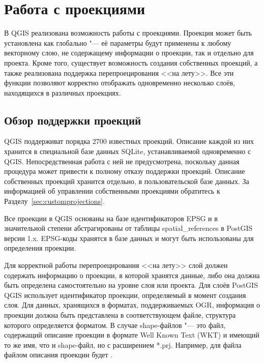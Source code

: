 
\chapter{Работа с проекциями}\label{label_projections}


В QGIS реализована возможность работы с проекциями. Проекция может быть
установлена как глобально "--- её параметры будут применены к любому
векторному слою, не содержащему информации о проекции, так и
отдельно для проекта. Кроме того, существует возможность создания
собственных проекций, а также реализована поддержка перепроецирования <<на
лету>>. Все эти функции позволяют корректно отображать одновременно несколько
слоёв, находящихся в различных проекциях.

\section{Обзор поддержки проекций}\label{label_projoverview}

QGIS поддерживат порядка 2700 известных проекций. Описание каждой из них
хранится в специальной базе данных SQLite, устанавливаемой одновременно
с QGIS. Непосредственная работа с ней не предусмотрена, поскольку данная
процедура может привести к полному отказу поддержки проекций. Описание
собственных проекций хранится отдельно, в пользовательской базе данных.
За информацией об управлении собственными проекциями обратитесь к
Разделу~\ref{sec:customprojections}.

Все проекции в QGIS основаны на базе идентификаторов EPSG и
в значительной степени абстрагированы от таблицы spatial\_references в
PostGIS версии 1.x. EPSG-коды хранятся в базе данных и
могут быть использованы для определения проекции.

Для корректной работы перепроецирования <<на лету>> слой должен содержать
информацию о проекции, в которой хранятся данные, либо она должна быть
определена самостоятельно на уровне слоя или проекта. Для слоёв PostGIS
QGIS использует идентификатор проекции, определяемый в момент создания
слоя. Для данных, хранящихся в форматах, поддерживаемых OGR, информация
о проекции должна быть представлена в соответствующем файле, структура которого
определяется форматом. В случае shape-файлов "--- это файл, содержащий описание
проекции в формате Well Known Text (WKT) и имеющий то же имя,
что и shape-файл, но с расширением *.prj. Например, для файла 
файлом описания проекции будет .

